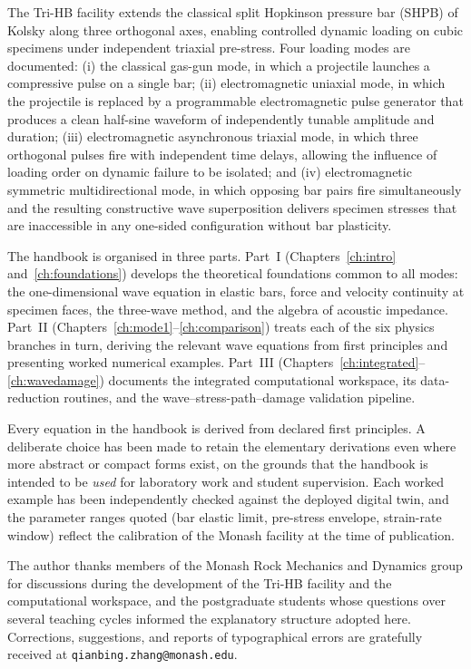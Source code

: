 \documentclass[11pt,a4paper,openany]{book}
\theoremstyle{handbook}
\begin{document}
The Tri-HB facility extends the classical split Hopkinson pressure bar (SHPB)
of Kolsky \cite{Kolsky1949} along three orthogonal axes, enabling controlled
dynamic loading on cubic specimens under independent triaxial pre-stress. Four
loading modes are documented: (i) the classical gas-gun mode, in which a
projectile launches a compressive pulse on a single bar; (ii) electromagnetic
uniaxial mode, in which the projectile is replaced by a programmable
electromagnetic pulse generator that produces a clean half-sine waveform of
independently tunable amplitude and duration; (iii) electromagnetic
asynchronous triaxial mode, in which three orthogonal pulses fire with
independent time delays, allowing the influence of loading order on dynamic
failure to be isolated; and (iv) electromagnetic symmetric multidirectional
mode, in which opposing bar pairs fire simultaneously and the resulting
constructive wave superposition delivers specimen stresses that are inaccessible
in any one-sided configuration without bar plasticity.

The handbook is organised in three parts. Part~I (Chapters~\ref{ch:intro}
and~\ref{ch:foundations}) develops the theoretical foundations common to all
modes: the one-dimensional wave equation in elastic bars, force and velocity
continuity at specimen faces, the three-wave method, and the algebra of
acoustic impedance. Part~II (Chapters~\ref{ch:mode1}--\ref{ch:comparison})
treats each of the six physics branches in turn, deriving the relevant wave
equations from first principles and presenting worked numerical examples.
Part~III (Chapters~\ref{ch:integrated}--\ref{ch:wavedamage}) documents the
integrated computational workspace, its data-reduction routines, and the
wave--stress-path--damage validation pipeline.

Every equation in the handbook is derived from declared first principles. A
deliberate choice has been made to retain the elementary derivations even where
more abstract or compact forms exist, on the grounds that the handbook is
intended to be \emph{used} for laboratory work and student supervision. Each
worked example has been independently checked against the deployed digital
twin, and the parameter ranges quoted (bar elastic limit, pre-stress envelope,
strain-rate window) reflect the calibration of the Monash facility at the time
of publication.

The author thanks members of the Monash Rock Mechanics and Dynamics group for
discussions during the development of the Tri-HB facility and the
computational workspace, and the postgraduate students whose questions over
several teaching cycles informed the explanatory structure adopted here.
Corrections, suggestions, and reports of typographical errors are gratefully
received at \texttt{qianbing.zhang@monash.edu}.
\end{document}
